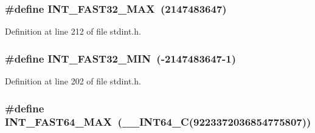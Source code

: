 \subsubsection[{\texorpdfstring{I\+N\+T\+\_\+\+F\+A\+S\+T32\+\_\+\+M\+AX}{INT_FAST32_MAX}}]{\setlength{\rightskip}{0pt plus 5cm}\#define I\+N\+T\+\_\+\+F\+A\+S\+T32\+\_\+\+M\+AX~(2147483647)}\hypertarget{win_2_l_a_d_s_p_a__plugins-win_2glibc__includes_2stdint_8h_ac96fa0f41b19e89f109e4f9913ca6635}{}\label{win_2_l_a_d_s_p_a__plugins-win_2glibc__includes_2stdint_8h_ac96fa0f41b19e89f109e4f9913ca6635}


Definition at line 212 of file stdint.\+h.

\subsubsection[{\texorpdfstring{I\+N\+T\+\_\+\+F\+A\+S\+T32\+\_\+\+M\+IN}{INT_FAST32_MIN}}]{\setlength{\rightskip}{0pt plus 5cm}\#define I\+N\+T\+\_\+\+F\+A\+S\+T32\+\_\+\+M\+IN~(-\/2147483647-\/1)}\hypertarget{win_2_l_a_d_s_p_a__plugins-win_2glibc__includes_2stdint_8h_ad93df1652ed0635513d5efe4f1219926}{}\label{win_2_l_a_d_s_p_a__plugins-win_2glibc__includes_2stdint_8h_ad93df1652ed0635513d5efe4f1219926}


Definition at line 202 of file stdint.\+h.

\subsubsection[{\texorpdfstring{I\+N\+T\+\_\+\+F\+A\+S\+T64\+\_\+\+M\+AX}{INT_FAST64_MAX}}]{\setlength{\rightskip}{0pt plus 5cm}\#define I\+N\+T\+\_\+\+F\+A\+S\+T64\+\_\+\+M\+AX~({\bf \+\_\+\+\_\+\+I\+N\+T64\+\_\+C}(9223372036854775807))}\hypertarget{win_2_l_a_d_s_p_a__plugins-win_2glibc__includes_2stdint_8h_a13c95cf9c209d8daacb36cbf0d5ba275}{}\label{win_2_l_a_d_s_p_a__plugins-win_2glibc__includes_2stdint_8h_a13c95cf9c209d8daacb36cbf0d5ba275}


